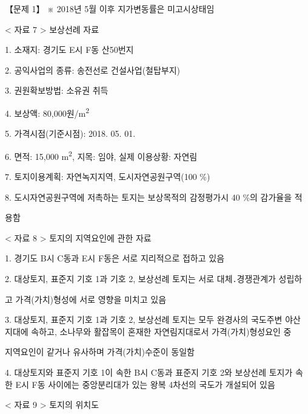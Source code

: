 \begin{longquestion}{【문제 1】}
※ 2018년 5월 이후 지가변동률은 미고시상태임 \par
< 자료 7 > 보상선례 자료 \par
1. 소재지: 경기도 E시 F동 산50번지 \par
2. 공익사업의 종류: 송전선로 건설사업(철탑부지) \par
3. 권원확보방법: 소유권 취득 \par
4. 보상액: 80,000원/m\textsuperscript{2} \par
5. 가격시점(기준시점): 2018. 05. 01. \par
6. 면적: 15,000 m\textsuperscript{2}, 지목: 임야, 실제 이용상황: 자연림 \par
7. 토지이용계획: 자연녹지지역, 도시자연공원구역(100 \%) \par
8. 도시자연공원구역에 저촉하는 토지는 보상목적의 감정평가시 40 \%의 감가율을 적 \par
용함 \par
< 자료 8 > 토지의 지역요인에 관한 자료 \par
1. 경기도 B시 C동과 E시 F동은 서로 지리적으로 접하고 있음 \par
2. 대상토지, 표준지 기호 1과 기호 2, 보상선례 토지는 서로 대체․경쟁관계가 성립하 \par
고 가격(가치)형성에 서로 영향을 미치고 있음 \par
3. 대상토지, 표준지 기호 1과 기호 2, 보상선례 토지는 모두 완경사의 국도주변 야산 지대에 속하고, 소나무와 활잡목이 혼재한 자연림지대로서 가격(가치)형성요인 중 \par
지역요인이 같거나 유사하며 가격(가치)수준이 동일함 \par
4. 대상토지와 표준지 기호 1이 속한 B시 C동과 표준지 기호 2와 보상선례 토지가 속한 E시 F동 사이에는 중앙분리대가 있는 왕복 4차선의 국도가 개설되어 있음 \par
< 자료 9 > 토지의 위치도 \par
\begin{center}
\end{center}
\end{longquestion}
